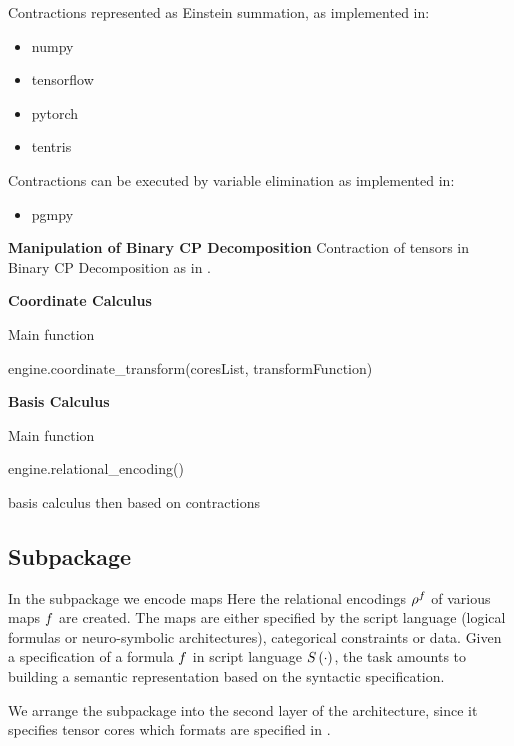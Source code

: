 Contractions represented as Einstein summation, as implemented in:
\begin{itemize}
	\item numpy
	\item tensorflow
	\item pytorch
	\item tentris
\end{itemize}

Contractions can be executed by variable elimination as implemented in:
\begin{itemize}
	\item pgmpy
\end{itemize}

\textbf{Manipulation of Binary CP Decomposition}
Contraction of tensors in Binary CP Decomposition as in .

\textbf{Coordinate Calculus}

Main function
\begin{centeredcode}
	engine.coordinate\_transform(coresList, transformFunction)
\end{centeredcode}

\textbf{Basis Calculus}

Main function 
\begin{centeredcode}
	engine.relational\_encoding()
\end{centeredcode}
basis calculus then based on contractions





\subsection{Subpackage \spencoding}

In the \spencoding subpackage we encode maps 
Here the relational encodings $\rho^{f}$ of various maps $f$ are created.
%
The maps are either specified by the script language (logical formulas or neuro-symbolic architectures), categorical constraints or data.
Given a specification of a formula $f$ in script language $S\left(\cdot\right)$, the task amounts to building a semantic representation based on the syntactic specification.

We arrange the \spencoding subpackage into the second layer of the \tnreason architecture, since it specifies tensor cores which formats are specified in \spengine.


